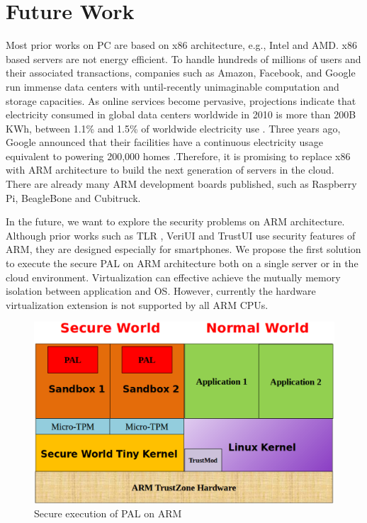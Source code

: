 \section{Future Work}
\label{sec:future}

Most prior works on PC are based on x86 architecture, e.g., Intel and AMD. x86
based servers are not energy efficient. To handle hundreds of millions of users
and their associated transactions, companies such as Amazon, Facebook, and
Google run immense data centers with until-recently unimaginable computation and
storage capacities. As online services become pervasive, projections indicate
that electricity consumed in global data centers worldwide in 2010 is more than
200B KWh, between 1.1\% and 1.5\% of worldwide electricity use \cite{times}. Three years ago,
Google announced that their facilities have a continuous electricity usage
equivalent to powering 200,000 homes \cite{nytimes-google}.Therefore, it is promising to replace x86
with ARM architecture to build the next generation of servers in the cloud.
There are already many ARM development boards published, such as Raspberry Pi,
BeagleBone and Cubitruck. 

In the future, we want to explore the security problems on ARM architecture.
Although prior works such as TLR \cite{TLR}, VeriUI \cite{VeriUI} and TrustUI
\cite{TrustUI} use security features of ARM, they are designed especially for
smartphones. We propose the first solution to execute the secure PAL on ARM
architecture both on a single server or in the cloud environment. Virtualization
can effective achieve the mutually memory isolation between application and OS.
However, currently the hardware virtualization extension is not supported by all
ARM CPUs.

\begin{figure}[htb]
\centering
\includegraphics[width=\columnwidth]{figures/future.eps}
\caption{Secure execution of PAL on ARM}
\label{fig:future}
\end{figure}

